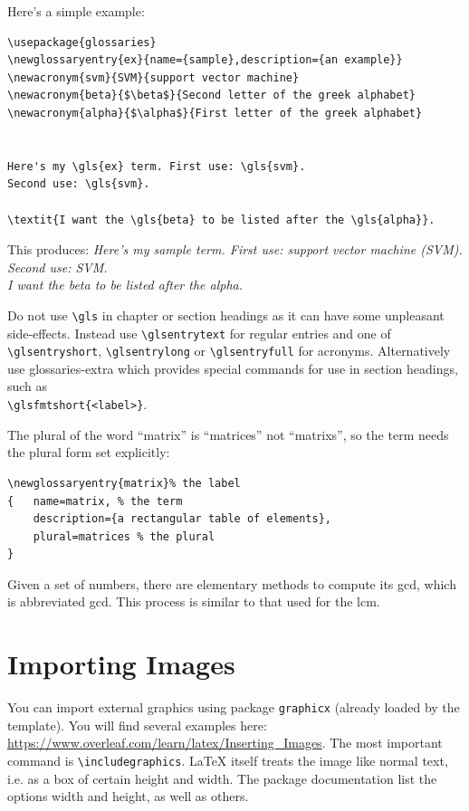 Here's a simple example:
\begin{verbatim}
\usepackage{glossaries} 
\newglossaryentry{ex}{name={sample},description={an example}}
\newacronym{svm}{SVM}{support vector machine}
\newacronym{beta}{$\beta$}{Second letter of the greek alphabet}
\newacronym{alpha}{$\alpha$}{First letter of the greek alphabet}


Here's my \gls{ex} term. First use: \gls{svm}. 
Second use: \gls{svm}.

\textit{I want the \gls{beta} to be listed after the \gls{alpha}}.

\end{verbatim}

This produces: \textit{Here's my sample term. First use: support vector machine (SVM).\\ Second use: SVM.\\
I want the \gls{beta} to be listed after the \gls{alpha}.}

Do not use \verb|\gls| in chapter or section headings as it can have some unpleasant side-effects. Instead use \verb|\glsentrytext| for regular entries and one of \verb|\glsentryshort|, \verb|\glsentrylong| or \verb|\glsentryfull| for acronyms. Alternatively use glossaries-extra which provides special commands for use in section headings, such as \\ \verb|\glsfmtshort{<label>}|.

The plural of the word ``\gls{matrix}'' is ``matrices'' not ``matrixs'', so the term needs the plural form set explicitly:

 \begin{verbatim}
\newglossaryentry{matrix}% the label
{	name=matrix, % the term
 	description={a rectangular table of elements}, 
	plural=matrices % the plural
}
 \end{verbatim}

Given a set of numbers, there are elementary methods to compute its \acrlong{gcd}, which is abbreviated \acrshort{gcd}. This process is similar to that used for the \acrfull{lcm}.

\section{Importing Images} %
\label{sec:importing_images}

You can import external graphics using package \verb|graphicx| (already loaded by the template). You will find several examples here: \url{https://www.overleaf.com/learn/latex/Inserting_Images}. The most important command is \verb|\includegraphics|. \LaTeX{} itself treats the image like normal text, i.e. as a box of certain height and width. The package documentation list the options width and height, as well as others.

